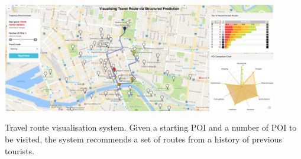 \documentclass[sigconf]{acmart}
\begin{document}


 \begin{teaserfigure}
 \centering
   \includegraphics[width=0.9\textwidth]{figure/sample_map.png}
   \caption{Travel route visualisation system. Given a starting POI and a number of POI to be visited, the system recommends a set of routes from a history of previous tourists.}
   \label{fig:overview}
 \end{teaserfigure}

\maketitle









 
\end{document}
